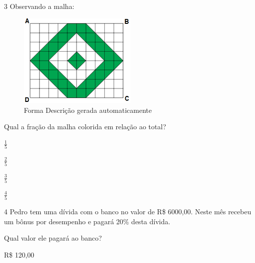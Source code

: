\begin{escolha}
\begin{escolha}
\begin{escolha}
\begin{escolha}
{\begin{boxmedio}
\begin{boxpeq}
\begin{q°}
\begin{boxmedio}
\begin{boxpeq}
\begin{boxpeq}
\begin{boxmedio}
\begin{boxmedio}
\begin{boxmedio}
\begin{largebox}
\begin{boxmedio}
{\begin{enumerate}
\begin{boxpeq}
{\begin{boxpeq}
\begin{boxpeq}
\begin{boxmedio}
\begin{boxpeq}
\begin{boxpeq}
\begin{boxpeq}
\num{3} Observando a malha:

\begin{figure}
\centering
\includegraphics[width=2.23809in,height=1.77753in]{./_SAEB_9_MAT/media/image240.png}
\caption{Forma Descrição gerada automaticamente}
\end{figure}


Qual a fração da malha colorida em relação ao total?

\begin{escolha}

  \item $\frac{1}{5}$

  \item $\frac{2}{5}$

  \item $\frac{3}{5}$

  \item $\frac{4}{5}$

\end{escolha}


\num{4} Pedro tem uma dívida com o banco no valor de R\$ 6000,00. Neste mês
recebeu um bônus por desempenho e pagará 20\% desta dívida.

Qual valor ele pagará ao banco?

\begin{escolha}

  \item R\$ 120,00


\end{escolha}
\end{boxpeq}
\end{boxpeq}
\end{boxpeq}
\end{boxmedio}
\end{boxpeq}
\end{boxpeq}}
\end{boxpeq}
\end{enumerate}}
\end{boxmedio}
\end{largebox}
\end{boxmedio}
\end{boxmedio}
\end{boxmedio}
\end{boxpeq}
\end{boxpeq}
\end{boxmedio}
\end{q°}
\end{boxpeq}
\end{boxmedio}}
\end{escolha}
\end{escolha}
\end{escolha}
\end{escolha}
